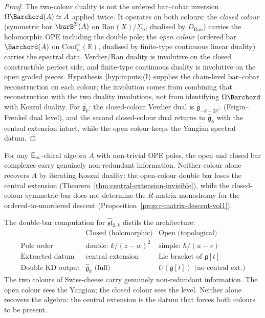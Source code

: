 \begin{proof}
The two-colour duality is not the ordered bar--cobar inversion
$\Omega\Barchord(A)\simeq A$ applied twice. It operates on both colours:
the \emph{closed colour}
(symmetric bar $\barB^{\Sigma}(A)$ on $\mathrm{Ran}(X)/\Sigma_n$,
dualised by $D_{\mathrm{Ran}}$) carries the holomorphic OPE including
the double pole; the \emph{open colour} (ordered bar
$\Barchord(A)$ on $\mathrm{Conf}_n^{<}(\mathbb{R})$,
dualised by finite-type continuous linear duality) carries the spectral
data. Verdier/Ran duality is involutive on the closed constructible
perfect side, and finite-type continuous duality is involutive on the
open graded pieces. Hypothesis~\ref{hyp:inputs}(I) supplies the
chain-level bar--cobar reconstruction on each colour; the involution
comes from combining that reconstruction with the two duality
involutions, not from identifying $\Omega\Barchord$ with Koszul duality.
For $\widehat{\mathfrak{g}}_k$: the closed-colour Verdier dual is
$\widehat{\mathfrak{g}}_{-k-2h^\vee}$ (Feigin--Frenkel dual level), and
the second closed-colour dual returns to $\widehat{\mathfrak{g}}_k$ with
the central extension intact, while the open colour keeps the Yangian
spectral datum.
\end{proof}

\begin{corollary}
\ClaimStatusProvedHere
\label{cor:two-colours-non-redundant}
For any $\mathsf{E}_{\infty}$-chiral algebra $A$ with non-trivial OPE poles, the
open and closed bar complexes carry genuinely non-redundant
information. Neither colour alone recovers $A$ by iterating Koszul
duality: the open-colour double bar loses the central extension
\textup{(Theorem~\ref{thm:central-extension-invisible})}, while the
closed-colour symmetric bar does not determine the $R$-matrix
monodromy for the ordered-to-unordered descent
\textup{(Proposition~\ref{prop:r-matrix-descent-vol1})}.
\end{corollary}

\begin{remark}
\label{rem:double-bar-architecture}
The double-bar computation for $\widehat{\mathfrak{sl}}_{2,k}$ distils the
architecture:
\[
\begin{array}{c|c|c}
& \text{Closed (holomorphic)} & \text{Open (topological)} \\
\hline
\text{Pole order} & \text{double: } k/(z-w)^2
 & \text{simple: } \hbar/(u-v) \\
\text{Extracted datum} & \text{central extension}
 & \text{Lie bracket of } \mathfrak{g}[t] \\
\text{Double KD output} & \widehat{\mathfrak{g}}_k \text{ (full)}
 & U(\mathfrak{g}[t]) \text{ (no central ext.)}
\end{array}
\]
The two colours of Swiss-cheese carry genuinely non-redundant
information. The open colour sees the Yangian; the closed colour sees
the level. Neither alone recovers the algebra: the central extension
is the datum that forces both colours to be present.
\end{remark}

